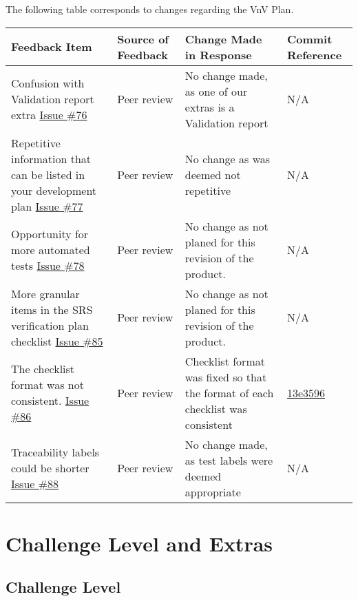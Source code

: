 \documentclass{article}
\begin{document}
The following table corresponds to changes regarding the VnV Plan.
\begin{longtable}{|p{4cm}|p{1.5cm}|p{4cm}|p{1.5cm}|}
    \hline
    \textbf{Feedback Item} & \textbf{Source of Feedback} & \textbf{Change Made in Response} & \textbf{Commit Reference} \\
    \hline
    \endfirsthead
    \hline
    \endhead
    \hline
    \endfoot
    \hline
    \endlastfoot
    Confusion with Validation report extra \href{https://github.com/gr812b/CVT-Simulator/issues/76}{Issue \#76} & Peer review  & No change made, as one of our extras is a Validation report & N/A \\
    \hline 
    Repetitive information that can be listed in your development plan \href{https://github.com/gr812b/CVT-Simulator/issues/77}{Issue \#77} & Peer review & No change as was deemed not repetitive & N/A \\
    \hline
    Opportunity for more automated tests \href{https://github.com/gr812b/CVT-Simulator/issues/78}{Issue \#78} & Peer review & No change as not planed for this revision of the product. & N/A \\
    \hline
    More granular items in the SRS verification plan checklist \href{https://github.com/gr812b/CVT-Simulator/issues/85}{Issue \#85} & Peer review & No change as not planed for this revision of the product. & N/A \\
    \hline
    The checklist format was not consistent. \href{https://github.com/gr812b/CVT-Simulator/issues/86}{Issue \#86} & Peer review & Checklist format was fixed so that the format of each checklist was consistent & 
    \href{https://github.com/gr812b/CVT-Simulator/commit/13e3596e7e3ba6fa7feca6426c6248aba93e2b49}{13e3596} \\
    \hline 
    Traceability labels could be shorter \href{https://github.com/gr812b/CVT-Simulator/issues/88}{Issue \#88} & Peer review  & No change made, as test labels were deemed appropriate  & N/A \\
    \hline 
\end{longtable}
\section{Challenge Level and Extras}

\subsection{Challenge Level}

\end{document}
